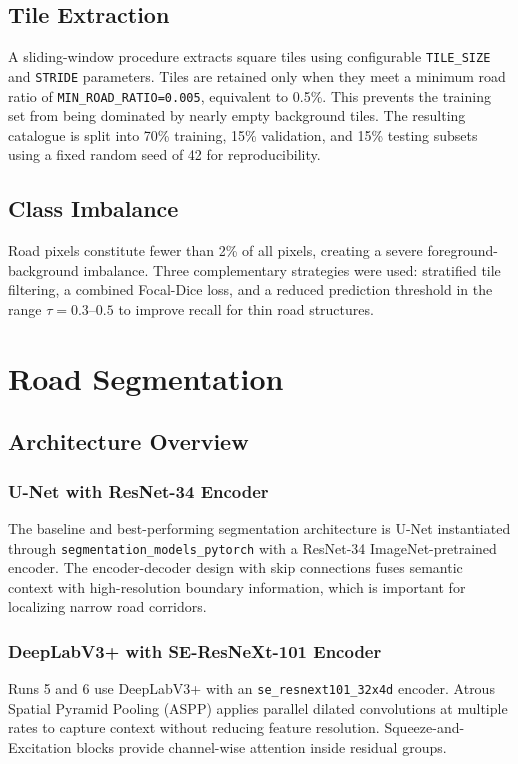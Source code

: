 ﻿\documentclass[conference]{IEEEtran}
\begin{document}
\subsection{Tile Extraction}
A sliding-window procedure extracts square tiles using configurable \texttt{TILE\_SIZE} and \texttt{STRIDE} parameters. Tiles are retained only when they meet a minimum road ratio of \texttt{MIN\_ROAD\_RATIO=0.005}, equivalent to 0.5\%. This prevents the training set from being dominated by nearly empty background tiles. The resulting catalogue is split into 70\% training, 15\% validation, and 15\% testing subsets using a fixed random seed of 42 for reproducibility.

\subsection{Class Imbalance}
Road pixels constitute fewer than 2\% of all pixels, creating a severe foreground-background imbalance. Three complementary strategies were used: stratified tile filtering, a combined Focal-Dice loss, and a reduced prediction threshold in the range $\tau=0.3$--$0.5$ to improve recall for thin road structures.

\section{Road Segmentation}
\subsection{Architecture Overview}
\subsubsection{U-Net with ResNet-34 Encoder}
The baseline and best-performing segmentation architecture is U-Net instantiated through \texttt{segmentation\_models\_pytorch} with a ResNet-34 ImageNet-pretrained encoder. The encoder-decoder design with skip connections fuses semantic context with high-resolution boundary information, which is important for localizing narrow road corridors.

\subsubsection{DeepLabV3+ with SE-ResNeXt-101 Encoder}
Runs 5 and 6 use DeepLabV3+ with an \texttt{se\_resnext101\_32x4d} encoder. Atrous Spatial Pyramid Pooling (ASPP) applies parallel dilated convolutions at multiple rates to capture context without reducing feature resolution. Squeeze-and-Excitation blocks provide channel-wise attention inside residual groups.
\end{document}
